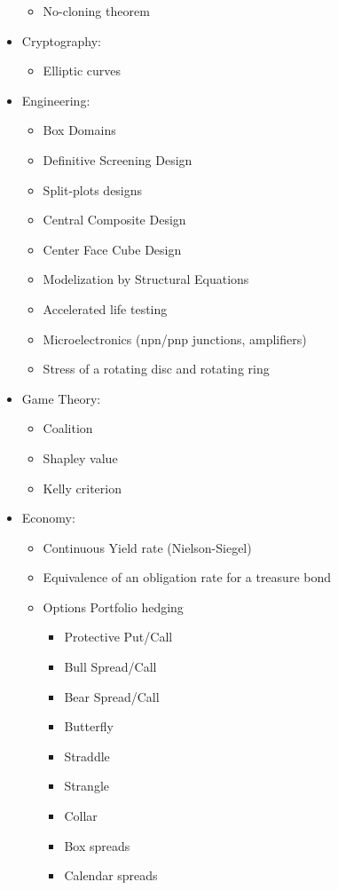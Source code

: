 \begin{itemize}
\begin{itemize}
				\item No-cloning theorem
			\end{itemize}
		\item Cryptography: 
			\begin{itemize}
				\item Elliptic curves
			\end{itemize}	
		\item Engineering:
			\begin{itemize}
				\item Box Domains
				\item Definitive Screening Design
				\item Split-plots designs				
				\item Central Composite Design
				\item Center Face Cube Design
				\item Modelization by Structural Equations				
				\item Accelerated life testing
				\item Microelectronics (npn/pnp junctions, amplifiers)
				\item Stress of a rotating disc and rotating ring
			\end{itemize} 
		\item Game Theory: 
			\begin{itemize}
				\item Coalition
				\item Shapley value
				\item Kelly criterion 
			\end{itemize}
		\item Economy: 
			\begin{itemize}
				\item Continuous Yield rate (Nielson-Siegel)
				\item Equivalence of an obligation rate for a treasure bond
				\item Options Portfolio hedging
				\begin{itemize}
					\item Protective Put/Call
					\item Bull Spread/Call
					\item Bear Spread/Call
					\item Butterfly
					\item Straddle
					\item Strangle
					\item Collar
					\item Box spreads
					\item Calendar spreads

\end{itemize}
\end{itemize}
\end{itemize}
